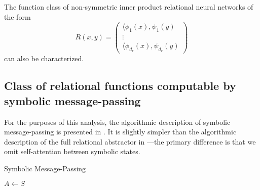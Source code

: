 \begin{remark}
	The function class of non-symmetric inner product relational neural networks of the form
	\[ R(x,y) = \begin{pmatrix}
		\langle \phi_1(x), \psi_1(y) \\
		\vdots \\
		\langle \phi_{d_r}(x), \psi_{d_r}(y)
	\end{pmatrix}\]
	can also be characterized.
\end{remark}

\subsection{Class of relational functions computable by symbolic message-passing}
\label{ssec:function_class_symbolic_mp}
For the purposes of this analysis, the algorithmic description of symbolic message-passing is presented in . It is slightly simpler than the algorithmic description of the full relational  abstractor in ---the primary difference is that we omit self-attention between symbolic states.

\begin{algorithm}[ht!]
	\caption{Symbolic Message-Passing}\label{alg:symbolic_mp}

	\vspace{1em}

	\(A \gets S\)

\end{algorithm}



